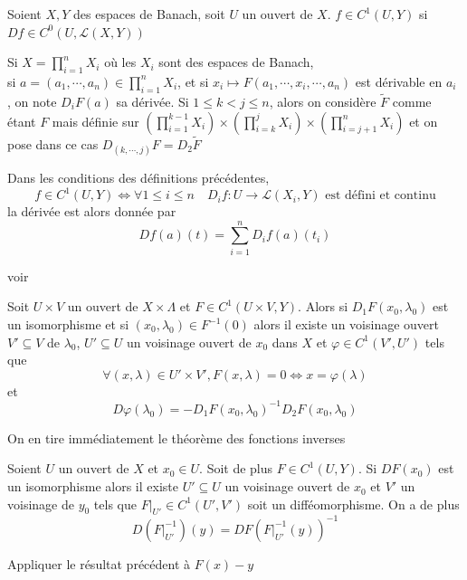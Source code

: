\documentclass[memoire.tex]{subfiles}
\begin{document}
\begin{definition}
    Soient $X,Y$ des espaces de Banach, soit $U$ un ouvert de $X$.
    $f\in C^1(U,Y)$ si $Df\in C^0(U,\mathcal{L}(X,Y))$
\end{definition}
\begin{definition}
    Si $X=\prod_{i=1}^n X_i$ où les $X_i$ sont des espaces 
    de Banach, \\si $a=(a_1,\cdots,a_n)\in\prod_{i=1}^n X_i$,  
    et si $x_i\mapsto F(a_1,\cdots,x_i,\cdots,a_n)$
    est dérivable en $a_i$ , on note  $D_{i}F(a)$ sa dérivée. Si $1\leq k<j \leq n$, alors on considère  $\tilde{F}$ comme étant $F$ mais définie sur $(\prod_{i=1}^{k-1} X_i)\times (\prod_{i=k}^{j} X_i)\times (\prod_{i=j+1}^{n} X_i)$ et on pose dans ce cas $D_{(k,\cdots,j) }F=D_2 \tilde{F}$ 
\end{definition}
\begin{proposition}
    Dans les conditions des définitions précédentes, 
    \begin{equation*}
        f\in C^1(U,Y)\Leftrightarrow
        \forall 1\leq i \leq n \quad  D_i f:U\rightarrow \mathcal{L}(X_i,Y)\text{ est défini et continu}
    \end{equation*}
    la dérivée est alors donnée par
    \begin{equation*}
        Df(a)(t)=\sum_{i=1}^n D_i f(a)(t_i)
    \end{equation*}
\end{proposition}
\begin{preuve}
    voir \cite{dieudonne1969fma8}
\end{preuve}
\begin{theobox}{}{}\label{FI}
Soit $U\times V$ un ouvert de $X\times\Lambda$ et $F\in C^1(U\times V,Y)$. Alors si $D_1 F(x_0,\lambda_0)$ est un isomorphisme et si $(x_0,\lambda_0)\in F^{-1}(0)$ alors il existe un voisinage  ouvert $V'\subseteq V$ de $\lambda_0$, $U'\subseteq U$ un voisinage ouvert de $x_0$ dans $X$ et $\varphi\in C^1(V',U')$ tels que 
\begin{equation*}
    \forall (x,\lambda)\in 
    U'\times V', F(x,\lambda)
    =0\Leftrightarrow x=\varphi
    (\lambda)
\end{equation*}
et 
\begin{equation*}
    D\varphi(\lambda_0)=-D_1F(x_0,\lambda_0)^{-1}D_2F(x_0,\lambda_0)
\end{equation*}
\end{theobox}
On en tire immédiatement le théorème des fonctions inverses 
\begin{corollaire}
    Soient $U$ un ouvert de $X$ et $x_0\in U$. Soit de plus $F\in C^1(U,Y)$.
    Si $DF(x_0)$ est un isomorphisme alors il existe $U'\subseteq U$ un voisinage ouvert de $x_0$ et $V'$ un voisinage de $y_0$ tels que
    $F|_{U'}\in C^1(U',V')$ soit un difféomorphisme. On a de plus
    \begin{equation*}
        D(F|_{U'}^{-1})(y)= DF(F|_{U'}^{-1}(y))^{-1}
    \end{equation*}
\end{corollaire}
\begin{preuve}
    Appliquer le résultat précédent à  $F(x)-y$
\end{preuve}
\end{document}
